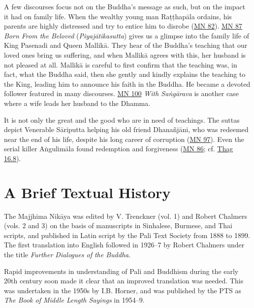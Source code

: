 \documentclass[12pt,openany]{book}%
\begin{document}
A few discourses focus not on the Buddha’s message as such, but on the impact it had on family life. When the wealthy young man \textsanskrit{Raṭṭhapāla} ordains, his parents are highly distressed and try to entice him to disrobe (\href{https://suttacentral.net/mn82}{MN 82}). \href{https://suttacentral.net/mn87}{MN 87} \textit{Born From the Beloved} (\textit{\textsanskrit{Piyajātikasutta}}) gives us a glimpse into the family life of King Pasenadi and Queen \textsanskrit{Mallikā}. They hear of the Buddha’s teaching that our loved ones bring us suffering, and when \textsanskrit{Mallikā} agrees with this, her husband is not pleased at all. \textsanskrit{Mallikā} is careful to first confirm that the teaching was, in fact, what the Buddha said, then she gently and kindly explains the teaching to the King, leading him to announce his faith in the Buddha. He became a devoted follower featured in many discourses. \href{https://suttacentral.net/mn100}{MN 100} \textit{With \textsanskrit{Saṅgārava}} is another case where a wife leads her husband to the Dhamma.

It is not only the great and the good who are in need of teachings. The suttas depict Venerable \textsanskrit{Sāriputta} helping his old friend \textsanskrit{Dhanañjāni}, who was redeemed near the end of his life, despite his long career of corruption (\href{https://suttacentral.net/mn97}{MN 97}). Even the serial killer \textsanskrit{Aṅgulimāla} found redemption and forgiveness (\href{https://suttacentral.net/mn86}{MN 86}; cf. \href{https://suttacentral.net/thag16.8}{Thag 16.8}).

\section*{A Brief Textual History}

The Majjhima \textsanskrit{Nikāya} was edited by V. Trenckner (vol. 1) and Robert Chalmers (vols. 2 and 3) on the basis of manuscripts in Sinhalese, Burmese, and Thai scripts, and published in Latin script by the Pali Text Society from 1888 to 1899. The first translation into English followed in 1926–7 by Robert Chalmers under the title \textit{Further Dialogues of the Buddha}.

Rapid improvements in understanding of Pali and Buddhism during the early 20th century soon made it clear that an improved translation was needed. This was undertaken in the 1950s by I.B. Horner, and was published by the PTS as \textit{The Book of Middle Length Sayings} in 1954–9.
\end{document}
